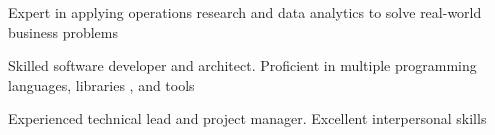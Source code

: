 


\vspace{-4mm}
\cventry
{} %
{} %
{} %
{} %
{
\begin{cvitems} %
    \item  {Expert in applying operations research and data analytics to solve real-world business problems} %
	\item  {Skilled software developer and architect. Proficient in multiple programming languages, libraries , and tools} 
	\item  {Experienced technical lead and project manager. Excellent interpersonal skills} 
\end{cvitems}    
}

